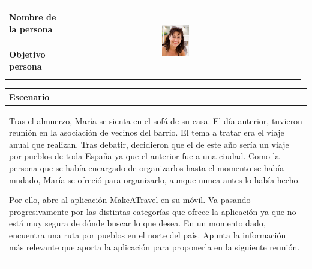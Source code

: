 \documentclass[11pt]{article}
\begin{document}
\begin{table}[H]
  \centering
  \begin{tabular}{p{0.2\linewidth}|p{0.3\linewidth}p{0.475\linewidth}}
    \toprule
    \textbf{Nombre de la persona} &  &\multirow{2}{*}{\begin{minipage}{1.\textwidth}\includegraphics[width=0.2\textwidth, height=30mm]{Maria}\end{minipage}}\\
    \textbf{Objetivo persona} &  & \\
    \bottomrule
  \end{tabular}

\begin{tabular}{p{1.028\linewidth}}
  \textbf{Escenario}\\
  \midrule
	Tras el almuerzo, María se sienta en el sofá de su casa. El día anterior, tuvieron reunión en la asociación de vecinos del barrio. El tema a tratar era el viaje anual que realizan. Tras debatir, decidieron que el de este año sería un viaje por pueblos de toda España ya que el anterior fue a una ciudad. Como la persona que se había encargado de organizarlos hasta el momento se había mudado, María se ofreció para organizarlo, aunque nunca antes lo había hecho.
	
	Por ello, abre al aplicación MakeATravel en su móvil. Va pasando progresivamente por las distintas categorías que ofrece la aplicación ya que no está muy segura de dónde buscar lo que desea. En un momento dado, encuentra una ruta por pueblos en el norte del país. Apunta la información más relevante que aporta la aplicación para proponerla en la siguiente reunión. 
\end{tabular}
\end{table}
\end{document}

